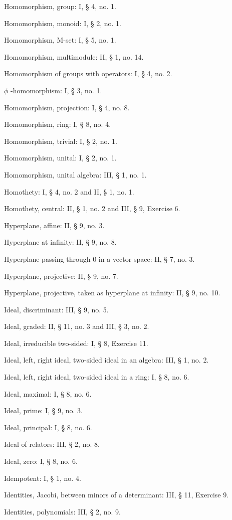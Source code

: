 Homomorphism, group: I, § 4, no. 1.

Homomorphism, monoid: I, § 2, no. 1.

Homomorphism, M-set: I, § 5, no. 1.

Homomorphism, multimodule: II, § 1, no. 14.

Homomorphism of groups with operators: I, § 4, no. 2.

\(\phi\) -homomorphism: I, § 3, no. 1.

Homomorphism, projection: I, § 4, no. 8.

Homomorphism, ring: I, § 8, no. 4.

Homomorphism, trivial: I, § 2, no. 1.

Homomorphism, unital: I, § 2, no. 1.

Homomorphism, unital algebra: III, § 1, no. 1.

Homothety: I, § 4, no. 2 and II, § 1, no. 1.

Homothety, central: II, § 1, no. 2 and III, § 9, Exercise 6.

Hyperplane, affine: II, § 9, no. 3.

Hyperplane at infinity: II, § 9, no. 8.

Hyperplane passing through 0 in a vector space: II, § 7, no. 3.

Hyperplane, projective: II, § 9, no. 7.

Hyperplane, projective, taken as hyperplane at infinity: II, § 9, no. 10.

Ideal, discriminant: III, § 9, no. 5.

Ideal, graded: II, § 11, no. 3 and III, § 3, no. 2.

Ideal, irreducible two-sided: I, § 8, Exercise 11.

Ideal, left, right ideal, two-sided ideal in an algebra: III, § 1, no. 2.

Ideal, left, right ideal, two-sided ideal in a ring: I, § 8, no. 6.

Ideal, maximal: I, § 8, no. 6.

Ideal, prime: I, § 9, no. 3.

Ideal, principal: I, § 8, no. 6.

Ideal of relators: III, § 2, no. 8.

Ideal, zero: I, § 8, no. 6.

Idempotent: I, § 1, no. 4.

Identities, Jacobi, between minors of a determinant: III, § 11, Exercise 9.

Identities, polynomials: III, § 2, no. 9.

